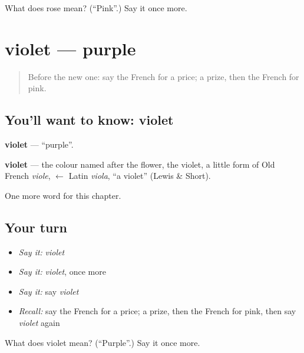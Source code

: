 \begin{tcolorbox}[breakable,colback=teal!4,colframe=teal!35!black,title={Before you move on}]
What does rose mean? (\textquotedblleft{}Pink\textquotedblright{}.) Say it once more.
\end{tcolorbox}
\section[violet]{violet — purple}

\label{lesson:FR-C130-violet}



\begin{quote}
Before the new one: say the French for a price; a prize, then the French for pink.
\end{quote}

\subsection*{You'll want to know: violet}
\textbf{violet} — \textquotedblleft{}purple\textquotedblright{}.

\begin{cousinweb}
\textbf{violet} — the colour named after the flower, the violet, a little form of Old French \emph{viole}, $\leftarrow$ Latin \emph{viola}, \textquotedblleft{}a violet\textquotedblright{} (Lewis \& Short).
\end{cousinweb}

\begin{grammarlens}[title={What you've built}]
One more word for this chapter.
\end{grammarlens}

\subsection*{Your turn}
\begin{itemize}
\raggedright
  \item \emph{Say it:} \emph{violet}
  \item \emph{Say it:} \emph{violet}, once more
  \item \emph{Say it:} say \emph{violet}
  \item \emph{Recall:} say the French for a price; a prize, then the French for pink, then say \emph{violet} again
\end{itemize}

\begin{tcolorbox}[breakable,colback=teal!4,colframe=teal!35!black,title={Before you move on}]
What does violet mean? (\textquotedblleft{}Purple\textquotedblright{}.) Say it once more.
\end{tcolorbox}

